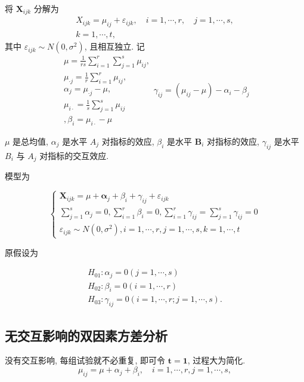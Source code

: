 将 \( \boldsymbol{X}_{i j k} \) 分解为
$$
\begin{array}{c}
X_{i j k}=\mu_{i j}+\varepsilon_{i j k}, \quad i=1, \cdots, r, \quad j=1, \cdots, s, \\
k=1, \cdots, t,
\end{array}
$$
其中 \( \varepsilon_{i j k} \sim N\left(0, \sigma^{2}\right) \), 且相互独立.  记
$$
\begin{array}{l}
\mu=\frac{1}{r s} \sum_{i=1}^{r} \sum_{j=1}^{s} \mu_{i j}, \\ \mu_{\cdot j}=\frac{1}{r} \sum_{i=1}^{r} \mu_{i j}, \\
 \alpha_{j}=\mu_{\cdot j}-\mu, \\
\mu_{i \cdot}=\frac{1}{s} \sum_{j=1}^{s} \mu_{i j} \\, 
 \beta_{i}=\mu_{i \cdot}-\mu
\end{array}
\gamma_{i j}=\left(\mu_{i j}-\mu\right)-\alpha_{i}-\beta_{j}
$$

\( \mu \) 是总均值, \( \alpha_{j} \) 是水平 \( A_{j} \) 对指标的效应, \( \beta_{i} \) 是水平 \( \boldsymbol{B}_{i} \)
对指标的效应, \( \gamma_{i j} \) 是水平 \( B_{i} \) 与 \( A_{j} \) 对指标的交互效应. 

模型为

$$ \left\{\begin{array}{l}\boldsymbol{X}_{i j k}=\mu+\boldsymbol{\alpha}_{j}+\beta_{i}+\gamma_{i j}+\varepsilon_{i j k} \\ \sum_{j=1}^{s} \alpha_{j}=0, \sum_{i=1}^{r} \beta_{i}=0, \sum_{i=1}^{r} \gamma_{i j}=\sum_{j=1}^{s} \gamma_{i j}=0 \\ \varepsilon_{i j k} \sim N\left(0, \sigma^{2}\right), i=1, \cdots, r, j=1, \cdots, s, k=1, \cdots, t\end{array}\right. $$

原假设为

$$
\begin{array}{l}
H_{01}: \alpha_{j}=0(j=1, \cdots, s) \\
H_{02}: \beta_{i}=0(i=1, \cdots, r) \\
H_{03}: \gamma_{i j}=0(i=1, \cdots, r ; j=1, \cdots, s) .
\end{array}
$$

\subsection{无交互影响的双因素方差分析}

没有交互影响, 每组试验就不必重复, 即可令 \( \boldsymbol{t}=\mathbf{1} \),
过程大为简化. 
$$
\mu_{i j}=\mu+\alpha_{j}+\beta_{i}, \quad i=1, \cdots, r, j=1, \cdots, s,
$$


